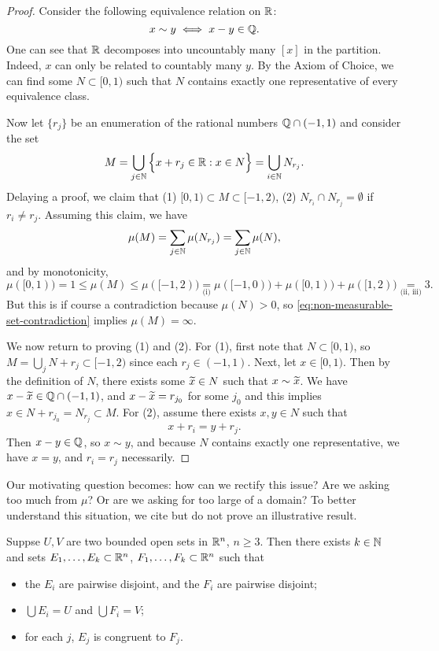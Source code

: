 \documentclass[12pt]{article} %
\begin{document}
\begin{proof}
    Consider the following equivalence relation on $\mathbb{R}$: \[x \sim y \iff x - y \in \mathbb{Q}.\] One can see that $\mathbb{R}$ decomposes into uncountably many $[x]$ in the partition. Indeed, $x$ can only be related to countably many $y$. By the Axiom of Choice, we can find some $N \subset [0,1)$ such that $N$ contains exactly one representative of every equivalence class.

    Now let $\{r_j\}$ be an enumeration of the rational numbers $\mathbb{Q} \cap (-1,1)$ and consider the set \[M = \bigcup_{j \in \mathbb{N}} \Big\{x + r_j \in \mathbb{R} : x \in N \Big\} = \bigcup_{i \in \mathbb{N}} N_{r_j}.\] Delaying a proof, we claim that (1) $[0,1) \subset M \subset [-1,2)$, (2) $N_{r_i} \cap N_{r_j} = \emptyset$ if $r_i \neq r_j$. Assuming this claim, we have \begin{align}\label{eq:non-measurable-set-contradiction}
        \mu(M) = \sum_{j \in \mathbb{N}} \mu(N_{r_j}) = \sum_{j \in \mathbb{N}} \mu(N),
    \end{align} and by monotonicity, \[\mu([0,1)) = 1 \leq \mu(M) \leq \mu([-1,2)) \underset{\text{(i)}}{=} \mu([-1,0)) + \mu([0,1)) + \mu([1,2)) \underset{\text{(ii, iii)}}{=} 3.\] But this is if course a contradiction because $\mu(N) > 0$, so \cref{eq:non-measurable-set-contradiction} implies $\mu(M) = \infty$.

    We now return to proving (1) and (2). For (1), first note that $N \subset [0,1)$, so $M = \bigcup_j N + r_j \subset [-1,2)$ since each $r_j \in (-1,1)$. Next, let $x \in [0,1)$. Then by the definition of $N$, there exists some $\widetilde{x} \in N$ such that $x \sim \widetilde{x}$. We have $x - \widetilde{x} \in \mathbb{Q} \cap (-1, 1)$, and $x-\widetilde{x} = r_{j_0}$ for some $j_0$ and this implies $x \in N + r_{j_0} = N_{r_j} \subset M$. For (2), assume there exists $x, y \in N$ such that \[x + r_i = y + r_j.\] Then $x - y \in \mathbb{Q}$, so $x \sim y$, and because $N$ contains exactly one representative, we have $x = y$, and $r_i = r_j$ necessarily.
\end{proof}

Our motivating question becomes: how can we rectify this issue? Are we asking too much from $\mu$? Or are we asking for too large of a domain? To better understand this situation, we cite but do not prove an illustrative result.

\begin{theorem}
    Suppse $U, V$ are two bounded open sets in $\mathbb{R}^n$, $n \geq 3$. Then there exists $k
    \in \mathbb{N}$ and sets $E_1, \ldots, E_k \subset \mathbb{R}^n$, $F_1, \ldots, F_k \subset \mathbb{R}^n$ such that \begin{itemize}
        \item the $E_i$ are pairwise disjoint, and the $F_i$ are pairwise disjoint;
        \item $\bigcup E_i = U$ and $\bigcup F_i = V$;
        \item for each $j$, $E_j$ is congruent to $F_j$.
    \end{itemize}
\end{theorem}
\end{document}

